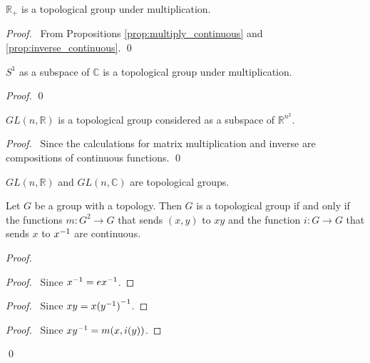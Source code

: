 \begin{ex}
$\mathbb{R}_+$ is a topological group under multiplication.
\end{ex}

\begin{proof}
\pf\ From Propositions \ref{prop:multiply_continuous} and \ref{prop:inverse_continuous}. \qed
\end{proof}

\begin{ex}
$S^1$ as a subspace of $\mathbb{C}$ is a topological group under multiplication.
\end{ex}

\begin{proof}
\pf
{}
\qed
\end{proof}

\begin{ex}
$GL(n, \mathbb{R})$ is a topological group considered as a subspace of $\mathbb{R}^{n^2}$.
\end{ex}

\begin{proof}
\pf\ Since the calculations for matrix multiplication and inverse are compositions of continuous functions. \qed
\end{proof}

\begin{ex}
$GL(n,\mathbb{R})$ and $GL(n,\mathbb{C})$ are topological groups.
\end{ex}

\begin{prop}
Let $G$ be a group with a topology. Then $G$ is a topological group if and only if the functions $m : G^2 \rightarrow G$ that sends $(x,y)$ to $xy$ and the function $i : G \rightarrow G$ that sends $x$ to ${x}^{-1}$ are continuous.
\end{prop}

\begin{proof}
\pf
{}
\begin{proof}
	\pf\ Since ${x}^{-1} = e {x}^{-1}$.
\end{proof}
\begin{proof}
	\pf\ Since $xy = x{({y}^{-1})}^{-1}$.
\end{proof}
\begin{proof}
	\pf\ Since $x{y}^{-1} = m(x,i(y))$.
\end{proof}
\qed
\end{proof}

